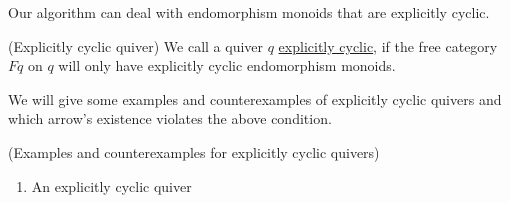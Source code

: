 Our algorithm can deal with endomorphism monoids that are explicitly cyclic.

\begin{definition}{(Explicitly cyclic quiver)}\label{def:explicitly_cyclic_quiver}
We call a quiver $q$ \ul{explicitly cyclic}, if the free category $Fq$ on $q$ will only have explicitly cyclic endomorphism monoids.
\end{definition}

We will give some examples and counterexamples of explicitly cyclic quivers and which arrow's existence violates the above condition.

\begin{example}{(Examples and counterexamples for explicitly cyclic quivers)}
\begin{enumerate}
\renewcommand{\labelenumi}{(\theenumi)}
\item An explicitly cyclic quiver


\end{enumerate}
\end{example}
